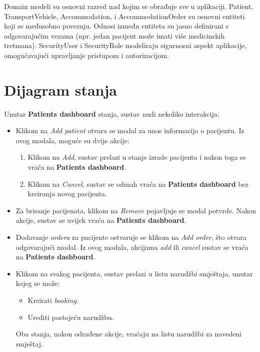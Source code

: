 			 Domain modeli su osnovni razred nad kojim se obrađuje sve u aplikaciji.  Patient, TransportVehicle, Accommodation, i AccommodationOrder su osnovni entiteti koji se međusobno povezuju. Odnosi između entiteta su jasno definirani s odgovarajućim vezama (npr. jedan pacijent može imati više medicinskih tretmana). SecurityUser i SecurityRole modeliraju sigurnosni aspekt aplikacije, omogućavajući upravljanje pristupom i autorizacijom. 
			
			
			\eject
		
		\section{Dijagram stanja}
			
			
			Unutar \textbf{Patients dashboard} stanja, sustav nudi nekoliko interakcija:
			
			\begin{itemize}
				\item Klikom na \textit{Add patient} otvara se modal za unos informacija o pacijentu. Iz ovog modala, moguće su dvije akcije:
				\begin{enumerate}
					\item Klikom na \textit{Add}, sustav prelazi u stanje izrade pacijenta i nakon toga se vraća na \textbf{Patients dashboard}.
					\item Klikom na \textit{Cancel}, sustav se odmah vraća na \textbf{Patients dashboard} bez kreiranja novog pacijenta.
				\end{enumerate}
				
				\item Za brisanje pacijenata, klikom na \textit{Remove} pojavljuje se modal potvrde. Nakon akcije, sustav se uvijek vraća na \textbf{Patients dashboard}.
				
				\item Dodavanje \textit{ordera} za pacijente ostvaruje se klikom na \textit{Add order}, što otvara odgovarajući modal. Iz ovog modala, akcijama \textit{add} ili \textit{cancel} sustav se vraća na \textbf{Patients dashboard}.
				
				\item Klikom na svakog pacijenta, sustav prelazi u listu narudžbi smještaja, unutar kojeg se može:
				\begin{itemize}
					\item Kreirati \textit{booking}.
					\item Urediti postojeću narudžbu.
				\end{itemize}
				Oba stanja, nakon odrađene akcije, vraćaju na listu narudžbi za navedeni smještaj.
			\end{itemize}
			
